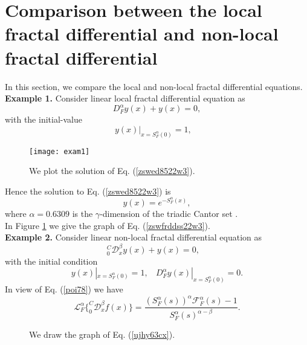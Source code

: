 \documentclass[12pt]{article}
\begin{document}
\section{ Comparison between the local fractal diﬀerential and non-local fractal diﬀerential \label{5-sec}}
In this section, we compare the local and non-local fractal differential equations.\\
\textbf{Example 1.} Consider  linear local fractal differential equation as
\begin{equation}\label{zswed8522w3}
   D_{F}^{\alpha} y(x)+y(x)=0,
\end{equation}
with the initial-value
\begin{equation}
y(x)|_{x=S_{F}^{\alpha}(0)}=1,~~~~
\end{equation}
\begin{figure}[H]
  \centering
  \texttt{[image: exam1]}
  \caption{We plot the solution of  Eq. (\ref{zswed8522w3}).}\label{swedwqsaq67b}
\end{figure}
Hence the solution to Eq. (\ref{zswed8522w3}) is
\begin{equation}\label{zswfrddss22w3}
y(x)=e^{-S_{F}^{\alpha}(x)},
\end{equation}
where $\alpha=0.6309$ is the $\gamma$-dimension of the  triadic Cantor  set \cite{ab12,Golmankhaneh-107-k}.\\ In Figure \ref{swedwqsaq67b} we give the graph of Eq. (\ref{zswfrddss22w3}).\\
\textbf{Example 2.} Consider  linear non-local fractal differential equation as
\begin{equation}\label{xszc2586de}
      _{0}^{C}\mathcal{D}_{x}^{\beta} y(x)+y(x)=0,~~~~
\end{equation}
with the initial condition
\begin{equation}\label{cx}
y(x)|_{x=S_{F}^{\alpha}(0)}=1,~~~~D_{F}^{\alpha} y(x)|_{x=S_{F}^{\alpha}(0)}=0.
\end{equation}
In view of  Eq. (\ref{poi78})  we have
\begin{equation}\label{z}
\mathcal{L}_{F}^{\alpha}\{  _{0}^{C}\mathcal{D}_{x}^{\beta}f(x) \}=\frac{(S_{F}^{\alpha}(s))^{ \alpha}\mathcal{F}_{F}^{\alpha}(s)-1 }{S_{F}^{\alpha}(s)^{\alpha-\beta}}.
\end{equation}
\begin{figure}[H]
  \centering
  \hfill
  \caption{We draw the graph of  Eq. (\ref{ujhy63cx}).}\label{figh2}
\end{figure}
\end{document}
